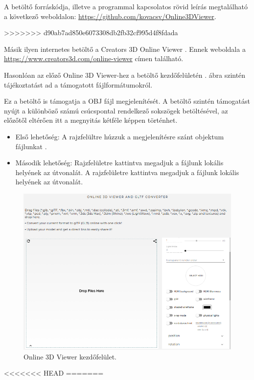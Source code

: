A betöltő forráskódja, illetve a programmal kapcsolatos rövid leírás megtalálható a következő weboldalon: \url{https://github.com/kovacsv/Online3DViewer}.

>>>>>>> d90ab7ad850e6073308db2fb32cf995d4f8fdada

Másik ilyen internetes betöltő a Creators 3D Online Viewer \cite{creators2018creators3d}.
Ennek weboldala a  \url{https://www.creators3d.com/online-viewer} címen található.

Hasonlóan az előző Online 3D Viewer-hez a betöltő kezdőfelületén . ábra szintén tájékoztatást ad a támogatott fájlformátumokról.

Ez a betöltő is támogatja a OBJ fájl megjelenítését. A betöltő szintén támogatást nyújt a különböző számú csúcspontal rendelkező sokszögek betöltésével, az előzőtől eltérően itt a megnyitás kétféle képpen történhet.
\begin{itemize}
\item Első lehetőség:
A rajzfelültre húzzuk a megjelenítésre szánt objektum fájlunkat .
\item Második lehetőség:
Rajzfelületre kattintva megadjuk a fájlunk lokális helyének az útvonalát.
A rajzfelületre kattintva megadjuk a fájlunk lokális helyének az útvonalát.
\end{itemize}

\begin{figure}[h]
	\centering
	\includegraphics[width=\textwidth]{images/3D_creators.png}
	\caption{Online 3D Viewer kezdőfelület.}
	\label{fig:3d1}
\end{figure}
<<<<<<< HEAD
\newpage
=======

